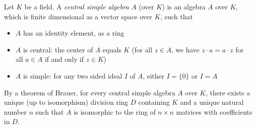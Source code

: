 \documentclass[12pt]{article}
\begin{document}
Let $K$ be a field. A {\em central simple algebra} $A$ (over $K$) is an algebra $A$ over $K$, which is finite dimensional as a vector space over $K$, such that
\begin{itemize}
\item $A$ has an identity element, as a ring
\item $A$ is central: the center of $A$ equals $K$ (for all $z \in A$, we have $z\cdot a = a \cdot z$ for all $a \in A$ if and only if $z \in K$)
\item $A$ is simple: for any two sided ideal $I$ of $A$, either $I = \{0\}$ or $I = A$
\end{itemize}

By a theorem of Brauer, for every central simple algebra $A$ over $K$, there exists a unique (up to isomorphism) division ring $D$ containing $K$ and a unique natural number $n$ such that $A$ is isomorphic to the ring of $n \times n$ matrices with coefficients in $D$.
\end{document}
